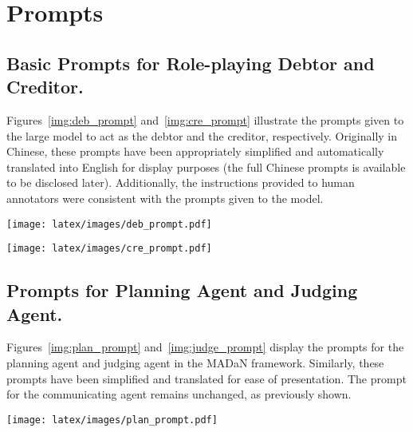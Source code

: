 \section{Prompts} 

\subsection{Basic Prompts for Role-playing Debtor and Creditor.} \label{app:prompts}

Figures~\ref{img:deb_prompt} and~\ref{img:cre_prompt} illustrate the prompts given to the large model to act as the debtor and the creditor, respectively. Originally in Chinese, these prompts have been appropriately simplified and automatically translated into English for display purposes (the full Chinese prompts is available to be disclosed later). Additionally, the instructions provided to human annotators were consistent with the prompts given to the model.

\begin{figure*}[htbp]
  \centering
  \texttt{[image: latex/images/deb\_prompt.pdf]}  
  \caption{Prompt of Debtor.}
\vspace{-0.0in}
\label{img:deb_prompt}
\end{figure*}

\begin{figure*}[htbp]
  \centering
  \texttt{[image: latex/images/cre\_prompt.pdf]}  
  \caption{Prompt of Creditor (Debt Collector).}
\vspace{-0.0in}
\label{img:cre_prompt}
\end{figure*}




\subsection{Prompts for Planning Agent and Judging Agent.} \label{app:agent_promopt}

Figures~\ref{img:plan_prompt} and~\ref{img:judge_prompt} display the prompts for the planning agent and judging agent in the MADaN framework. Similarly, these prompts have been simplified and translated for ease of presentation. The prompt for the communicating agent remains unchanged, as previously shown.


\begin{figure*}[htbp]
  \centering
  \texttt{[image: latex/images/plan\_prompt.pdf]}  
  \caption{Prompt of Planning Agent.}
\vspace{-0.0in}
\label{img:plan_prompt}
\end{figure*}

